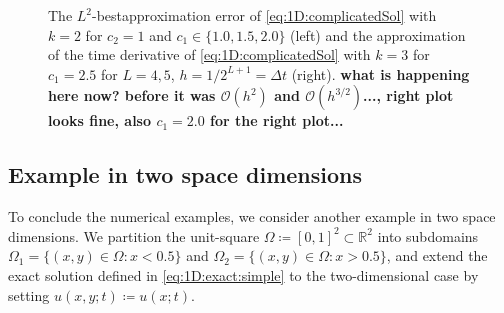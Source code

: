 \documentclass[sn-mathphys-num]{sn-jnl}
\numberwithin{equation}{section}
\begin{document}
\begin{figure}[!htbp]
\begin{center}
        \caption{The $L^2$-bestapproximation error of \eqref{eq:1D:complicatedSol} with $k = 2$ for $c_2 = 1$ and $c_1 \in \{1.0,1.5,2.0\}$ (left) and the approximation of the time derivative of \eqref{eq:1D:complicatedSol} with $k = 3$ for $c_1 = 2.5$ for $L = 4,5$, $h = 1/2^{L+1} = \Delta t$ (right). \textbf{what is happening here now? before it was $\mathcal{O}(h^2)$ and $\mathcal{O}(h^{3/2})$..., right plot looks fine, also $c_1 = 2.0$ for the right plot...}}
        \label{fig:1D:complicatedSol}
    \end{center}
  \end{figure}



\subsection{Example in two space dimensions}
To conclude the numerical examples, we consider another example in two space dimensions. We partition the unit-square $\Omega \coloneqq [0,1]^2 \subset \mathbb{R}^2$ into subdomains $\Omega_1 = \{ (x,y) \in \Omega: x < 0.5 \}$ and $\Omega_2 = \{ (x,y) \in \Omega: x > 0.5 \}$, and 
extend the exact solution defined in \eqref{eq:1D:exact:simple} to the two-dimensional case by setting $u(x,y;t) \coloneqq u(x;t)$. 
\end{document}
